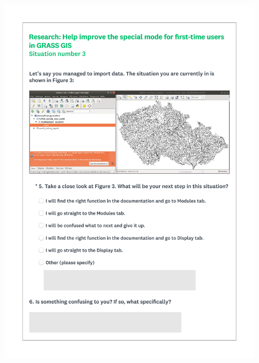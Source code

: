 \documentclass[a4paper,10pt,twoside]{article}
\begin{document}
 \newpage
 \begin{figure}[hbt!]
 \begin{center}
 \includegraphics[width=16cm]{../surveys/questionnaires/survey2-page5_questions5_6.pdf}
 \end{center}
 \end{figure}
 
\end{document}
